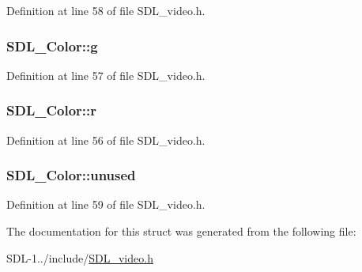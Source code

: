 Definition at line 58 of file S\+D\+L\+\_\+video.\+h.

\hypertarget{struct_s_d_l___color_ae29d881bf740cfa7078b36e07f85d298}{}
\subsubsection[{g}]{ S\+D\+L\+\_\+\+Color\+::g}\label{struct_s_d_l___color_ae29d881bf740cfa7078b36e07f85d298}


Definition at line 57 of file S\+D\+L\+\_\+video.\+h.

\hypertarget{struct_s_d_l___color_a0bb975b6829524133fdd3c6060cfa63d}{}
\subsubsection[{r}]{ S\+D\+L\+\_\+\+Color\+::r}\label{struct_s_d_l___color_a0bb975b6829524133fdd3c6060cfa63d}


Definition at line 56 of file S\+D\+L\+\_\+video.\+h.

\hypertarget{struct_s_d_l___color_a72c141f474a236dd0e881a4167783e2e}{}
\subsubsection[{unused}]{ S\+D\+L\+\_\+\+Color\+::unused}\label{struct_s_d_l___color_a72c141f474a236dd0e881a4167783e2e}


Definition at line 59 of file S\+D\+L\+\_\+video.\+h.



The documentation for this struct was generated from the following file\+:\begin{DoxyCompactItemize}
\item 
S\+D\+L-\/1../include/\hyperlink{_s_d_l__video_8h}{S\+D\+L\+\_\+video.\+h}\end{DoxyCompactItemize}

